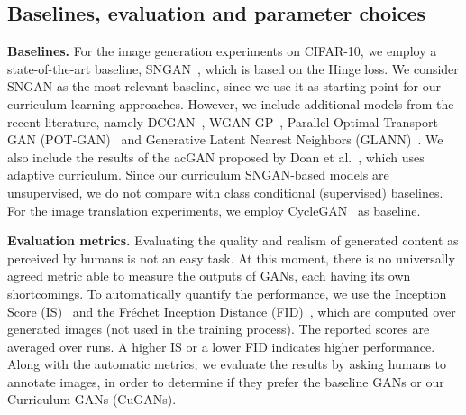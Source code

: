 \documentclass[10pt,twocolumn,letterpaper]{article}
\begin{document}
\vspace{-0.1cm}
\subsection{Baselines, evaluation and parameter choices}
\vspace{-0.1cm}

\noindent 
{\bf Baselines.}
For the image generation experiments on CIFAR-10, we employ a state-of-the-art baseline, SNGAN~\cite{Miyato-ICLR-2018}, which is based on the Hinge loss. We consider SNGAN as the most relevant baseline, since we use it as starting point for our curriculum learning approaches. However, we include additional models from the recent literature, namely DCGAN~\cite{Radford-ICLR-2016}, WGAN-GP~\cite{Gulrajani-NIPS-2017}, Parallel Optimal Transport GAN (POT-GAN)~\cite{Avraham-CVPR-2019} and Generative Latent Nearest Neighbors (GLANN)~\cite{Hoshen-CVPR-2019}. We also include the results of the acGAN proposed by Doan et al.~\cite{Doan-AAAI-2019}, which uses adaptive curriculum. Since our curriculum SNGAN-based models are unsupervised, we do not compare with class conditional (supervised) baselines.
For the image translation experiments, we employ CycleGAN~\cite{Zhu-ICCV-2017} as baseline. 

\noindent 
{\bf Evaluation metrics.}
Evaluating the quality and realism of generated content as perceived by humans is not an easy task. At this moment, there is no universally agreed metric able to measure the outputs of GANs, each having its own shortcomings. To automatically quantify the performance, we use the Inception Score (IS)~\cite{Salimans-NIPS-2016} and the Fr\'echet Inception Distance (FID)~\cite{Heusel-NIPS-2017}, which are computed over  generated images (not used in the training process). The reported scores are averaged over  runs. A higher IS or a lower FID indicates higher performance.
Along with the automatic metrics, we evaluate the results by asking humans to annotate images, in order to determine if they prefer the baseline GANs or our Curriculum-GANs (CuGANs). 
\end{document}
